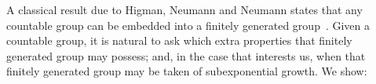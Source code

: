 \documentclass{amsart}
\theoremstyle{definition}
\begin{document}
A classical result due to Higman, Neumann and Neumann states that any
countable group can be embedded into a finitely generated
group~\cite{higman-n-n:embed}. Given a countable group,
it is natural to ask
%
%
%
%
%
% 
which extra properties that finitely generated group may possess; and,
in the case that interests us, when that finitely generated group may
be taken of subexponential growth. We show:
\end{document}
